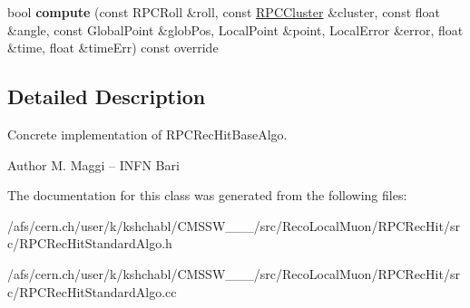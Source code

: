 \begin{DoxyCompactItemize}
\item 
\hypertarget{classRPCRecHitStandardAlgo_a308f50dbd6a9bc77893514818b2f1430}{bool {\bfseries compute} (const R\-P\-C\-Roll \&roll, const \hyperlink{classRPCCluster}{R\-P\-C\-Cluster} \&cluster, const float \&angle, const Global\-Point \&glob\-Pos, Local\-Point \&point, Local\-Error \&error, float \&time, float \&time\-Err) const override}\label{classRPCRecHitStandardAlgo_a308f50dbd6a9bc77893514818b2f1430}

\end{DoxyCompactItemize}


\subsection{Detailed Description}
Concrete implementation of R\-P\-C\-Rec\-Hit\-Base\-Algo.

\begin{DoxyAuthor}{Author}
M. Maggi -- I\-N\-F\-N Bari 
\end{DoxyAuthor}


The documentation for this class was generated from the following files\-:\begin{DoxyCompactItemize}
\item 
/afs/cern.\-ch/user/k/kshchabl/\-C\-M\-S\-S\-W\-\_\-\_\-\_/src/\-Reco\-Local\-Muon/\-R\-P\-C\-Rec\-Hit/src/R\-P\-C\-Rec\-Hit\-Standard\-Algo.\-h\item 
/afs/cern.\-ch/user/k/kshchabl/\-C\-M\-S\-S\-W\-\_\-\_\-\_/src/\-Reco\-Local\-Muon/\-R\-P\-C\-Rec\-Hit/src/R\-P\-C\-Rec\-Hit\-Standard\-Algo.\-cc\end{DoxyCompactItemize}
